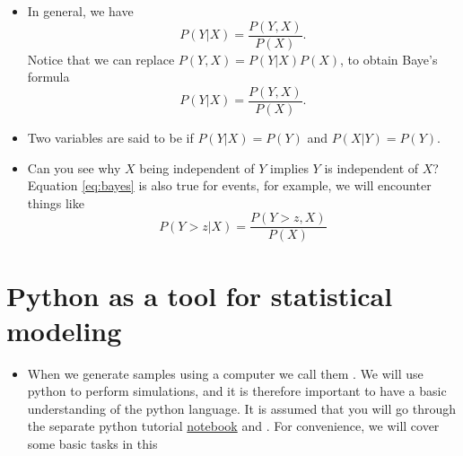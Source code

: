 \begin{itemize}
\item In general, we have 
\begin{equation}
P(Y|X) = \frac{P(Y,X)}{P(X)}.
\end{equation}
Notice that we can replace $P(Y,X) = P(Y|X)P(X)$, to obtain Baye's formula 
\begin{equation}\label{eq:bayes}
P(Y|X) = \frac{P(Y,X)}{P(X)}.
\end{equation}
\item Two variables are said to be  if $P(Y|X)  = P(Y)$ and $P(X|Y) = P(Y)$.  
\item Can you see why $X$ being independent of $Y$ implies $Y$ is independent of $X$?
Equation \eqref{eq:bayes} is also true for events, for example, we will encounter things like 
\begin{equation}\label{eq:bayes}
P(Y>z|X) = \frac{P(Y>z,X)}{P(X)}
\end{equation}


\end{itemize}




\section{Python as a tool for statistical modeling \cite[Sec. 2.3]{islp}}
\begin{itemize}
\item When we generate samples using a computer we call them . We will use python to perform simulations, and it is therefore important to have a basic understanding of the python language. It is assumed that you will go through the separate python tutorial \href{https://colab.research.google.com/drive/1Gs-gSsUP1hHVwhrbwvWzLVm1ulcLJKRI#scrollTo=_c4br6SCUtUy}{notebook} and \cite[Sec. 2.3]{islp}. For convenience, we will cover some basic tasks in this 
\end{itemize}


